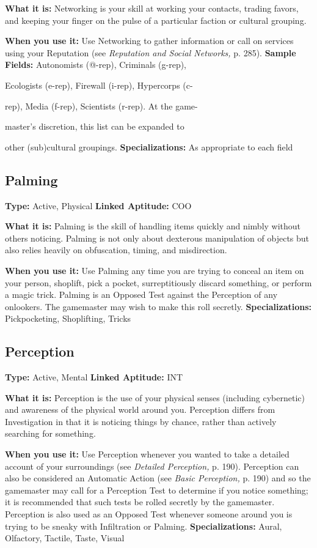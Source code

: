 \textbf{What it is:} Networking is your skill at working your 
contacts, trading favors, and keeping your finger on 
the pulse of a particular faction or cultural grouping.

\textbf{When you use it:} Use Networking to gather information
or call on services using your Reputation (see
\textit{Reputation and Social Networks,} p. 285).
\textbf{Sample Fields:} Autonomists (@-rep), Criminals (g-rep), 

Ecologists (e-rep), Firewall (i-rep), Hypercorps (c-

rep), Media (f-rep), Scientists (r-rep). At the game-

master's discretion, this list can be expanded to 

other (sub)cultural groupings.
\textbf{Specializations:} As appropriate to each field

\subsection{Palming}

\textbf{Type:} Active, Physical
\textbf{Linked Aptitude:} COO

\textbf{What it is:} Palming is the skill of handling items quickly
and nimbly without others noticing. Palming is not
only about dexterous manipulation of objects but also 
relies heavily on obfuscation, timing, and misdirection.

\textbf{When you use it:} Use Palming any time you are 
trying to conceal an item on your person, shoplift, 
pick a pocket, surreptitiously discard something, or 
perform a magic trick. Palming is an Opposed Test 
against the Perception of any onlookers. The gamemaster
may wish to make this roll secretly.
\textbf{Specializations:} Pickpocketing, Shoplifting, Tricks

\subsection{Perception}

\textbf{Type:} Active, Mental
\textbf{Linked Aptitude:} INT

\textbf{What it is:} Perception is the use of your physical 
senses (including cybernetic) and awareness of the 
physical world around you. Perception differs from 
Investigation in that it is noticing things by chance, 
rather than actively searching for something.

\textbf{When you use it:} Use Perception whenever you 
wanted to take a detailed account of your surroundings
(see \textit{Detailed Perception,} p. 190). Perception
can also be considered an Automatic Action (see 
\textit{Basic Perception, }p. 190) and so the gamemaster may 
call for a Perception Test to determine if you notice 
something; it is recommended that such tests be rolled 
secretly by the gamemaster. Perception is also used as 
an Opposed Test whenever someone around you is 
trying to be sneaky with Infiltration or Palming.
\textbf{Specializations:} Aural, Olfactory, Tactile, Taste, Visual

